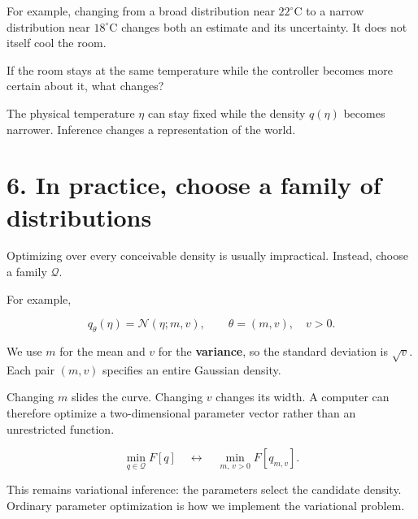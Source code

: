 \documentclass[
  letterpaper,
  DIV=11,
  numbers=noendperiod]{scrreprt}
\begin{document}
For example, changing from a broad distribution near
\(22^\circ\mathrm C\) to a narrow distribution near
\(18^\circ\mathrm C\) changes both an estimate and its uncertainty. It
does not itself cool the room.

\begin{tcolorbox}[enhanced jigsaw, arc=.35mm, bottomrule=.15mm, bottomtitle=1mm, breakable, colback=white, colbacktitle=quarto-callout-tip-color!10!white, colframe=quarto-callout-tip-color-frame, coltitle=black, left=2mm, leftrule=.75mm, opacityback=0, opacitybacktitle=0.6, rightrule=.15mm, title=\textcolor{quarto-callout-tip-color}{\faLightbulb}\hspace{0.5em}{Pause and check}, titlerule=0mm, toprule=.15mm, toptitle=1mm]

If the room stays at the same temperature while the controller becomes
more certain about it, what changes?

The physical temperature \(\eta\) can stay fixed while the density
\(q(\eta)\) becomes narrower. Inference changes a representation of the
world.

\end{tcolorbox}

\section{6. In practice, choose a family of
distributions}\label{in-practice-choose-a-family-of-distributions}

Optimizing over every conceivable density is usually impractical.
Instead, choose a family \(\mathcal Q\).

For example,

\[
q_\theta(\eta)=\mathcal N(\eta;m,v),
\qquad \theta=(m,v),\quad v>0.
\]

We use \(m\) for the mean and \(v\) for the \textbf{variance}, so the
standard deviation is \(\sqrt v\). Each pair \((m,v)\) specifies an
entire Gaussian density.

Changing \(m\) slides the curve. Changing \(v\) changes its width. A
computer can therefore optimize a two-dimensional parameter vector
rather than an unrestricted function.

\[
\min_{q\in\mathcal Q}F[q]
\quad\longleftrightarrow\quad
\min_{m,\,v>0}F[q_{m,v}].
\]

This remains variational inference: the parameters select the candidate
density. Ordinary parameter optimization is how we implement the
variational problem.
\end{document}
